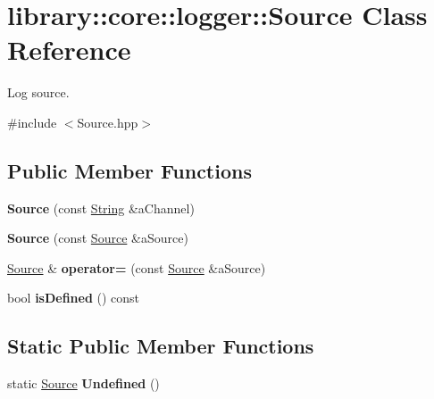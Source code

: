 \hypertarget{classlibrary_1_1core_1_1logger_1_1_source}{}\section{library\+:\+:core\+:\+:logger\+:\+:Source Class Reference}
\label{classlibrary_1_1core_1_1logger_1_1_source}


Log source.  




{\ttfamily \#include $<$Source.\+hpp$>$}

\subsection*{Public Member Functions}
\begin{DoxyCompactItemize}
\item 
\mbox{\label{classlibrary_1_1core_1_1logger_1_1_source_a2e40fbdae5f8f4dd6a075992f11a939f}} 
{\bfseries Source} (const \hyperlink{classlibrary_1_1core_1_1types_1_1_string}{String} \&a\+Channel)
\item 
\mbox{\label{classlibrary_1_1core_1_1logger_1_1_source_ae9d7e82827aa19efdd1c25d91911a9a6}} 
{\bfseries Source} (const \hyperlink{classlibrary_1_1core_1_1logger_1_1_source}{Source} \&a\+Source)
\item 
\mbox{\label{classlibrary_1_1core_1_1logger_1_1_source_a844032b697c7727ea4e5519fb64fc955}} 
\hyperlink{classlibrary_1_1core_1_1logger_1_1_source}{Source} \& {\bfseries operator=} (const \hyperlink{classlibrary_1_1core_1_1logger_1_1_source}{Source} \&a\+Source)
\item 
\mbox{\label{classlibrary_1_1core_1_1logger_1_1_source_ae6316fb0d4e45ea172bdb7004777e9b4}} 
bool {\bfseries is\+Defined} () const
\end{DoxyCompactItemize}
\subsection*{Static Public Member Functions}
\begin{DoxyCompactItemize}
\item 
\mbox{\label{classlibrary_1_1core_1_1logger_1_1_source_a098cba108fe47612f9ddbfb228a5ef8f}} 
static \hyperlink{classlibrary_1_1core_1_1logger_1_1_source}{Source} {\bfseries Undefined} ()
\end{DoxyCompactItemize}
